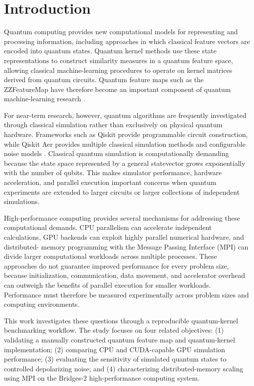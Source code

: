 \documentclass[pdflatex,sn-mathphys-num]{sn-jnl}%
\theoremstyle{thmstyleone}%
\theoremstyle{thmstyletwo}%
\theoremstyle{thmstylethree}%
\begin{document}
\section{Introduction}\label{sec1}

Quantum computing provides new computational models for representing and
processing information, including approaches in which classical feature vectors
are encoded into quantum states. Quantum kernel methods use these state
representations to construct similarity measures in a quantum feature space,
allowing classical machine-learning procedures to operate on kernel matrices
derived from quantum circuits. Quantum feature maps such as the ZZFeatureMap
have therefore become an important component of quantum machine-learning
research \cite{havlicek2019}.

For near-term research, however, quantum algorithms are frequently investigated
through classical simulation rather than exclusively on physical quantum
hardware. Frameworks such as Qiskit provide programmable circuit construction,
while Qiskit Aer provides multiple classical simulation methods and configurable
noise models \cite{qiskit2024,qiskitaer2025}. Classical quantum simulation is
computationally demanding because the state space represented by a general
statevector grows exponentially with the number of qubits. This makes simulator
performance, hardware acceleration, and parallel execution important concerns
when quantum experiments are extended to larger circuits or larger collections
of independent simulations.

High-performance computing provides several mechanisms for addressing these
computational demands. CPU parallelism can accelerate independent calculations,
GPU backends can exploit highly parallel numerical hardware, and distributed-
memory programming with the Message Passing Interface (MPI) can divide larger
computational workloads across multiple processes. These approaches do not
guarantee improved performance for every problem size, because initialization,
communication, data movement, and accelerator overhead can outweigh the
benefits of parallel execution for smaller workloads. Performance must therefore
be measured experimentally across problem sizes and computing environments.

This work investigates these questions through a reproducible quantum-kernel
benchmarking workflow. The study focuses on four related objectives:
(1) validating a manually constructed quantum feature map and quantum-kernel
implementation; (2) comparing CPU and CUDA-capable GPU simulation performance;
(3) evaluating the sensitivity of simulated quantum states to controlled
depolarizing noise; and (4) characterizing distributed-memory scaling using MPI
on the Bridges-2 high-performance computing system.
\end{document}
